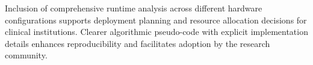 Inclusion of comprehensive runtime analysis across different hardware configurations supports deployment planning and resource allocation decisions for clinical institutions. Clearer algorithmic pseudo-code with explicit implementation details enhances reproducibility and facilitates adoption by the research community.
